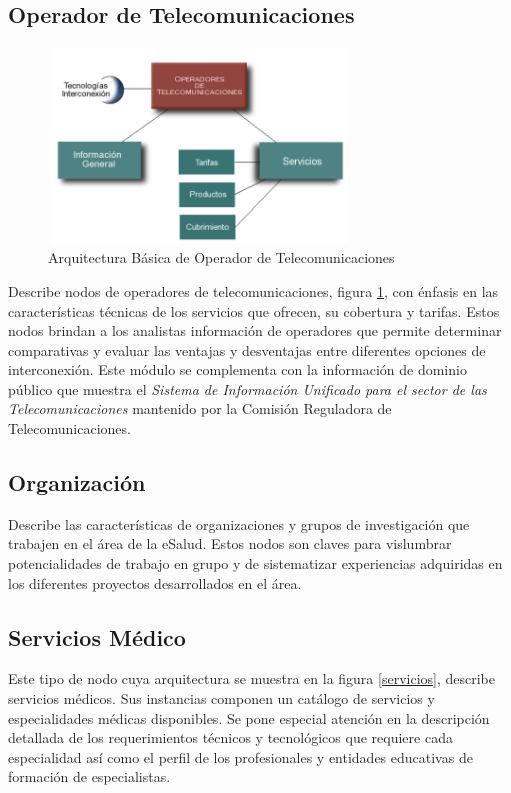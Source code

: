 \subsection{Operador de Telecomunicaciones}

\begin{figure}
 \centering
 \includegraphics[width=80mm, height=52mm]{operadores.png}
 \caption{Arquitectura Básica de Operador de Telecomunicaciones}
 \label{operadores}
\end{figure}

Describe nodos de operadores de telecomunicaciones, figura \ref{operadores}, con énfasis en las características técnicas de los servicios que ofrecen, su cobertura y tarifas. Estos nodos brindan a los analistas información de operadores que permite determinar comparativas y evaluar las ventajas y desventajas entre diferentes opciones de interconexión. Este módulo se complementa con la información de dominio público que muestra el \textit{Sistema de Información Unificado para el sector de las Telecomunicaciones} mantenido por la Comisión Reguladora de Telecomunicaciones.

\subsection{Organización} 

Describe las características de organizaciones y grupos de investigación que trabajen en el área de la eSalud.  Estos nodos son claves para vislumbrar potencialidades de trabajo en grupo y de sistematizar experiencias adquiridas en los diferentes proyectos desarrollados en el área. 

\subsection{Servicios Médico} 
Este tipo de nodo cuya arquitectura se muestra en la figura \ref{servicios}, describe servicios médicos. Sus instancias componen un catálogo de servicios y especialidades médicas disponibles. Se pone especial atención en la descripción detallada de los requerimientos técnicos y tecnológicos que requiere cada especialidad así como el perfil de los profesionales y entidades educativas de formación de especialistas. 

